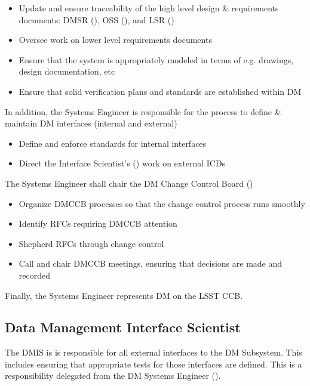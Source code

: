 \begin{itemize}
\item Update and ensure traceability of the high level design \& requirements documents: \gls{DMSR} (), \gls{OSS} (), and \gls{LSR} ()
\item Oversee work on lower level requirements documents
\item Ensure  that the system is appropriately modeled in terms of e.g. drawings, design documentation, etc
\item Ensure  that solid verification plans and standards are established within \gls{DM}
\end{itemize}

In addition, the \gls{Systems Engineer} is responsible for the process to define \& maintain \gls{DM} interfaces (internal and external)

\begin{itemize}
\item Define and enforce standards for internal interfaces
\item Direct the Interface Scientist's () work on external ICDs
\end{itemize}

The \gls{Systems Engineer} shall chair the \gls{DM} \gls{Change Control Board} ()

\begin{itemize}
\item Organize \gls{DMCCB} processes so that the change control process runs smoothly
\item Identify RFCs requiring \gls{DMCCB} attention
\item Shepherd RFCs through change control
\item Call and chair \gls{DMCCB} meetings, ensuring that decisions are made and recorded
\end{itemize}

Finally, the \gls{Systems Engineer} represents \gls{DM} on the \gls{LSST} \gls{CCB}.

\subsection{Data Management Interface Scientist}\label{role:dmis}

The \gls{DMIS} is is responsible for all external interfaces to the \gls{DM} \gls{Subsystem}. This includes ensuring that appropriate tests for those interfaces are defined. This is a responsibility delegated from the \gls{DM} \gls{Systems Engineer} ().

